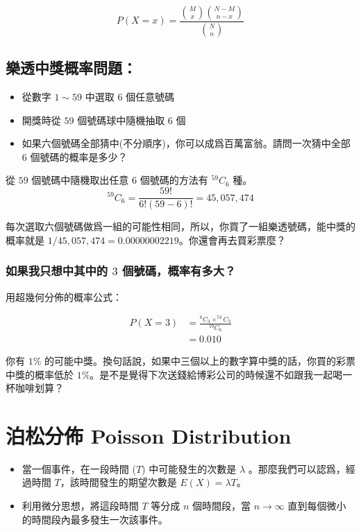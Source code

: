 \documentclass[]{ctexbook}
\providecommand{\tightlist}{%
  \setlength{\itemsep}{0pt}\setlength{\parskip}{0pt}}
\begin{document}
\[P(X=x)=\frac{\binom{M}{x}\binom{N-M}{n-x}}{\binom{N}{n}}\]

\section{樂透中獎概率問題：}

\begin{itemize}
\tightlist
\item
  從數字 \(1\sim59\) 中選取 \(6\) 個任意號碼
\item
  開獎時從 \(59\) 個號碼球中隨機抽取 \(6\) 個
\item
  如果六個號碼全部猜中(不分順序)，你可以成爲百萬富翁。請問一次猜中全部
  \(6\) 個號碼的概率是多少？
\end{itemize}

從 \(59\) 個號碼中隨機取出任意 \(6\) 個號碼的方法有 \(^{59}C_6\) 種。
\[^{59}C_6=\frac{59!}{6!(59-6)!}=45,057,474\]

每次選取六個號碼做爲一組的可能性相同，所以，你買了一組樂透號碼，能中獎的概率就是
\(1/45,057,474 = 0.00000002219\)。你還會再去買彩票麼？

\subsection{\texorpdfstring{如果我只想中其中的 \(3\)
個號碼，概率有多大？}{如果我只想中其中的 3 個號碼，概率有多大？}}\label{-3-}

用超幾何分佈的概率公式：

\begin{align}
P(X=3) &= \frac{^6C_3\times ^{53}C_3}{^{59}C_6} \\
       &= 0.010
\end{align}

你有 \(1\%\)
的可能中獎。換句話說，如果中三個以上的數字算中獎的話，你買的彩票中獎的概率低於
\(1\%\)。是不是覺得下次送錢給博彩公司的時候還不如跟我一起喝一杯咖啡划算？

\chapter{泊松分佈 Poisson Distribution}\label{-poisson-distribution}

\begin{itemize}
\tightlist
\item
  當一個事件，在一段時間 (\(T\)) 中可能發生的次數是 \(\lambda\)
  。那麼我們可以認爲，經過時間 \(T\)，該時間發生的期望次數是
  \(E(X)=\lambda T\)。
\item
  利用微分思想，將這段時間 \(T\) 等分成 \(n\) 個時間段，當
  \(n\rightarrow\infty\) 直到每個微小的時間段內最多發生一次該事件。
\end{itemize}
\end{document}
